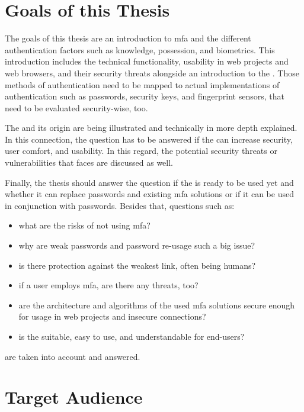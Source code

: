 \section{Goals of this Thesis}
\label{sec:goals}

The goals of this thesis are an introduction to \gls{mfa} and the different authentication factors such as \frqq knowledge, possession, and biometrics\flqq. This introduction includes the technical functionality, usability in web projects and web browsers, and their security threats alongside an introduction to the \wa. Those methods of authentication need to be mapped to actual implementations of authentication such as passwords, security keys, and fingerprint sensors, that need to be evaluated security-wise, too.

The \wa{} and its origin are being illustrated and technically in more depth explained. In this connection, the question has to be answered if the \wa{} can increase security, user comfort, and usability. In this regard, the potential security threats or vulnerabilities that \wa{} faces are discussed as well.

Finally, the thesis should answer the question if the \wa{} is ready to be used yet and whether it can replace passwords and existing \gls{mfa} solutions or if it can be used in conjunction with passwords. Besides that, questions such as:

\begin{itemize}
	\item what are the risks of not using \gls{mfa}?
	\item why are weak passwords and password re-usage such a big issue?
	\item is there protection against the weakest link, often being humans?
	\item if a user employs \gls{mfa}, are there any threats, too?
	\item are the architecture and algorithms of the used \gls{mfa} solutions secure enough for usage in web projects and insecure connections?
	\item is the \wa{} suitable, easy to use, and understandable for end-users?
\end{itemize}

are taken into account and answered.

\section{Target Audience}

